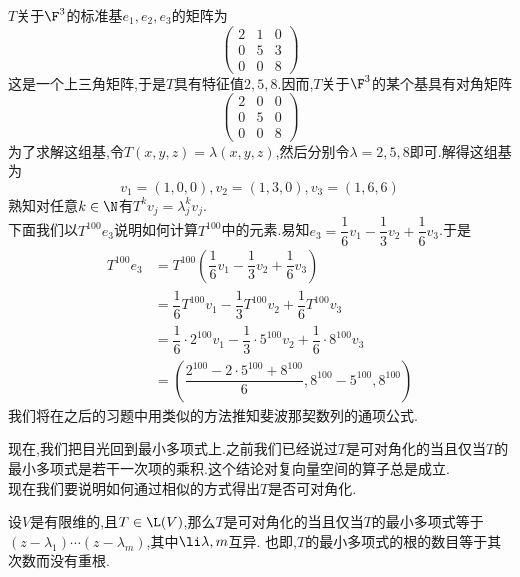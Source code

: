 \documentclass{ctexart}
\begin{document}
\begin{solution}[Solution.]
    $T$关于$\F^3$的标准基$e_1,e_2,e_3$的矩阵为
    $$\begin{pmatrix}
        2&1&0\\0&5&3\\0&0&8
    \end{pmatrix}$$
    这是一个上三角矩阵,于是$T$具有特征值$2,5,8$.因而,$T$关于$\F^3$的某个基具有对角矩阵
    $$\begin{pmatrix}
        2&0&0\\0&5&0\\0&0&8
    \end{pmatrix}$$
    为了求解这组基,令$T(x,y,z)=\lambda(x,y,z)$,然后分别令$\lambda=2,5,8$即可.解得这组基为
    $$v_1=(1,0,0),v_2=(1,3,0),v_3=(1,6,6)$$
    熟知对任意$k\in\N$有$T^kv_j=\lambda_j^kv_j$.\\
    下面我们以$T^{100}e_3$说明如何计算$T^{100}$中的元素.易知$e_3=\dfrac{1}{6}v_1-\dfrac{1}{3}v_2+\dfrac{1}{6}v_3$.于是
    $$\begin{aligned}
        T^{100}e_3
        &= T^{100}\left(\dfrac{1}{6}v_1-\dfrac{1}{3}v_2+\dfrac{1}{6}v_3\right) \\
        &= \dfrac{1}{6}T^{100}v_1-\dfrac{1}{3}T^{100}v_2+\dfrac{1}{6}T^{100}v_3 \\
        &= \dfrac{1}{6}\cdot 2^{100}v_1-\dfrac{1}{3}\cdot 5^{100}v_2+\dfrac{1}{6}\cdot 8^{100}v_3 \\
        &= \left(\dfrac{2^{100}-2\cdot 5^{100}+8^{100}}{6},8^{100}-5^{100},8^{100}\right)
    \end{aligned}$$
    我们将在之后的习题中用类似的方法推知斐波那契数列的通项公式.
\end{solution}\noindent
现在,我们把目光回到最小多项式上.之前我们已经说过$T$是可对角化的当且仅当$T$的最小多项式是若干一次项的乘积.这个结论对复向量空间的算子总是成立.\\
现在我们要说明如何通过相似的方式得出$T$是否可对角化.
\begin{formal}[2.4 可对角化的充要条件]
    设$V$是有限维的,且$T\in\L(V)$,那么$T$是可对角化的当且仅当$T$的最小多项式等于$(z-\lambda_1)\cdots(z-\lambda_m)$,其中$\li\lambda,m$互异.%
    也即,$T$的最小多项式的根的数目等于其次数而没有重根.
\end{formal}\noindent
\end{document}
